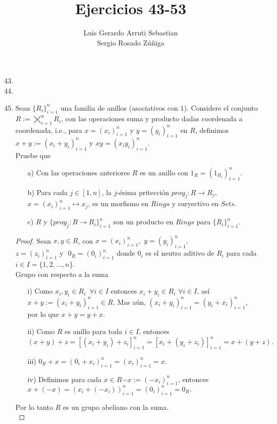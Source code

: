 \documentclass{article}
\title{Ejercicios 43-53}
\author{Luis Gerardo Arruti Sebastian\\ Sergio Rosado Zúñiga}
\date{}
\begin{document}
	\maketitle
	\begin{enumerate}[label=\textbf{Ej \arabic*.}]
		\setcounter{enumi}{42}


\item 
\item 

\item Sean $\{R_i\}_{i=1}^n$ una familia de anillos (asociativos con $1$). Considere el conjunto $R:=\displaystyle\bigtimes_{i=1}^nR_i$, con las
operaciones suma y producto dadas  coordenada a coordenada, i.e., para $\displaystyle x=(x_i)^n_{i=1}$ y $\displaystyle y=(y_i)_{i=1}^n$ en $R$,
 definimos $\displaystyle x+y:=(x_i+y_i)_{i=1}^n$ y $\displaystyle xy=(x_iy_i)_{i=1}^n$.\\

Pruebe que 
\begin{enumerate}
\item[a)] Con las operaciones anteriores $R$ es un anillo con $1_R=(1_{R_i})_{i=1}^n.$
\item[b)] Para cada $j\in [1,n]$, la $j$-ésima pritección $proy_j:R\to R_j,$\\ $x=(x_i)_{i=1}^n\mapsto x_j$, es un morfismo en $Rings$ y 
suryectivo en $Sets$.
\item[c)] $R$ y $\{proy_j:R\to R_i\}_{i=1}^n$ son un producto en $Rings$ para $\{R_i\}_{i=1}^n$.
\end{enumerate}
\begin{proof}
 Sean $x,y\in R$, con $x=(x_i)_{i=1}^n,\,\,y=(y_i)_{i=1}^n,$\\ 
$z=(z_i)_{i=1}^n\,\,$y \,\,$0_R=(0_i)_{i=1}^n$ donde $0_i$ es el neutro aditivo de $R_i$ para cada $i\in I=\{1,2,\ldots,n\}$.\\

Grupo con respecto a la suma
\begin{itemize}
\item[i)] Como $x_i,y_i\in R_i\,\,\,\forall i\in I$ entonces $x_i+y_i\in R_i\,\,\forall i\in I$, así \\$x+y:=(x_i+y_i)_{i=1}^n\in R$. Mas aún, 
$(x_i+y_i)_{i=1}^n=(y_i+x_i)_{i=1}^n$, por lo que $x+y=y+x$.
\item[ii)] Como $R$ es anillo para toda $i\in I$, entonces 
\[(x+y)+z=[(x_i+y_i)+z_i]_{i=1}^n=[x_i+(y_i+z_i)]_{i=1}^n=x+(y+z).\]
\item[iii)] $0_R+x=(0_i+x_i)_{i=1}^n=(x_i)_{i=1}^n=x$.
\item[iv)] Definimos para cada $x\in R$\quad $-x:=(-x_i)_{i=1}^n$, entonces \\$x+(-x)=(x_i+(-x_i))_{i=1}^n=(0_i)_{i=1}^n=0_R.$
\end{itemize}
Por lo tanto $R$ es un grupo abeliano con la suma.\\


\end{proof}
\end{enumerate}
\end{document}

